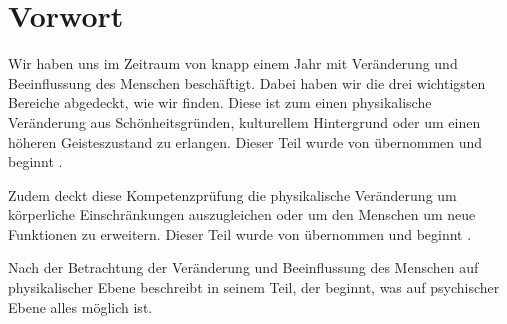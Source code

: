 \chapter{Vorwort}
\label{sec:preface}

Wir haben uns im Zeitraum von knapp einem Jahr mit Veränderung und Beeinflussung des Menschen
beschäftigt.
Dabei haben wir die drei wichtigsten Bereiche abgedeckt, wie wir finden. Diese ist zum einen
physikalische Veränderung aus Schönheitsgründen, kulturellem Hintergrund oder um einen höheren
Geisteszustand zu erlangen. Dieser Teil wurde von  übernommen und beginnt
.

Zudem deckt diese Kompetenzprüfung die physikalische Veränderung um körperliche Einschränkungen
auszugleichen oder um den Menschen um neue Funktionen zu erweitern. Dieser Teil wurde von
 übernommen und beginnt .

Nach der Betrachtung der Veränderung und Beeinflussung des Menschen auf physikalischer Ebene
beschreibt  in seinem Teil, der 
beginnt, was auf psychischer Ebene alles möglich ist.
